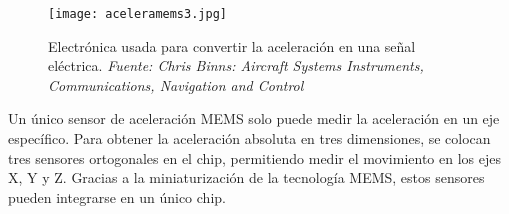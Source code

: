 \begin{figure}[H]
    \centering
    \texttt{[image: aceleramems3.jpg]}
    \caption{\centering Electrónica usada para convertir la aceleración en una señal eléctrica. \textit{ Fuente: Chris Binns: Aircraft Systems Instruments, Communications, Navigation and Control}}
    \label{fig:mems3}
\end{figure}

Un único sensor de aceleración MEMS solo puede medir la aceleración en un eje específico. Para obtener la aceleración absoluta en tres dimensiones, se colocan tres sensores ortogonales en el chip, permitiendo medir el movimiento en los ejes X, Y y Z. Gracias a la miniaturización de la tecnología MEMS, estos sensores pueden integrarse en un único chip.



